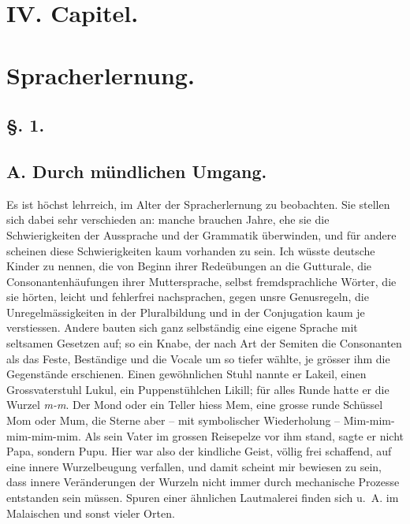 \label{sp.65}

\section*{IV. Capitel.}
\section*{Spracherlernung.}
\subsection*{§. 1.}\label{II.IV.1}
\subsection*{A. Durch mündlichen Umgang.}

Es ist höchst lehrreich,  im Alter der Spracherlernung zu beobachten. Sie stellen sich dabei sehr verschieden an: manche brauchen Jahre, ehe sie die Schwierigkeiten der Aussprache und der Grammatik überwinden, und für andere scheinen diese Schwierigkeiten kaum vorhanden zu sein. Ich wüsste deutsche Kinder zu nennen, die von Beginn ihrer Redeübungen an die Gutturale, die Consonantenhäufungen ihrer Muttersprache, selbst fremdsprachliche Wörter, die sie hörten, leicht und fehlerfrei nachsprachen, gegen unsre Genusregeln, die Unregelmässigkeiten in der Pluralbildung und in der Conjugation kaum je verstiessen. Andere bauten sich ganz selbständig eine eigene Sprache mit seltsamen Gesetzen auf; so ein Knabe, der nach Art der Semiten die Consonanten als das Feste, Beständige  und die Vocale um so tiefer wählte, je grösser ihm die Gegenstände erschienen. Einen gewöhnlichen Stuhl nannte er Lakeil, einen Grossvaterstuhl Lukul, ein Puppenstühlchen Likill; für alles Runde hatte er die Wurzel \textit{m-m}. Der Mond oder ein Teller hiess Mem, eine grosse runde Schüssel Mom oder Mum, die Sterne aber – mit symbolischer Wiederholung – Mim-mim-mim-mim-mim. Als sein Vater im grossen Reisepelze vor ihm stand, sagte er nicht Papa, sondern Pupu. Hier war also der kindliche Geist, völlig frei schaffend, auf eine innere Wurzelbeugung verfallen, und damit scheint mir bewiesen zu sein, dass innere Veränderungen der Wurzeln nicht immer durch mechanische Prozesse entstanden sein müssen. Spuren einer ähnlichen Lautmalerei finden sich u.~A. im Malaischen und sonst vieler Orten.

